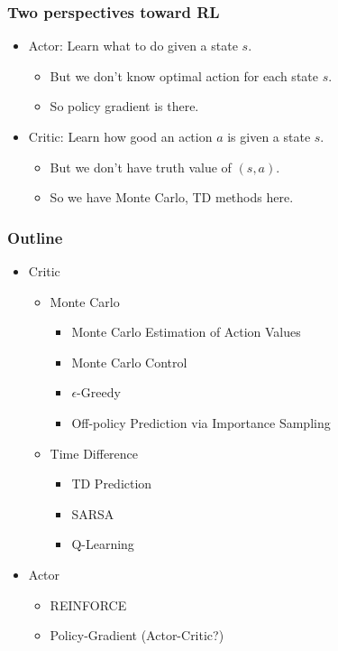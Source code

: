 \begin{frame}
  \frametitle{Two perspectives toward RL}
  \begin{itemize}
  \item Actor: Learn what to do given a state $s$.
    \begin{itemize}
    \item But we don't know optimal action for each state $s$.
    \item So policy gradient is there.
    \end{itemize}
  \item Critic: Learn how good an action $a$ is given a state $s$.
    \begin{itemize}
    \item But we don't have truth value of $(s, a)$.
    \item So we have Monte Carlo, TD methods here.
    \end{itemize}
  \end{itemize}
\end{frame}

\begin{frame}
  \frametitle{Outline}
  \begin{itemize}
  \item Critic
    \begin{itemize}
    \item Monte Carlo
      \begin{itemize}
      \item Monte Carlo Estimation of Action Values
      \item Monte Carlo Control
      \item $\epsilon$-Greedy
      \item Off-policy Prediction via Importance Sampling
      \end{itemize}
    \item Time Difference
      \begin{itemize}
      \item TD Prediction
      \item SARSA
      \item Q-Learning
      \end{itemize}
    \end{itemize}
  \item Actor
    \begin{itemize}
    \item REINFORCE
    \item Policy-Gradient (Actor-Critic?)
    \end{itemize}
  \end{itemize}
\end{frame}


